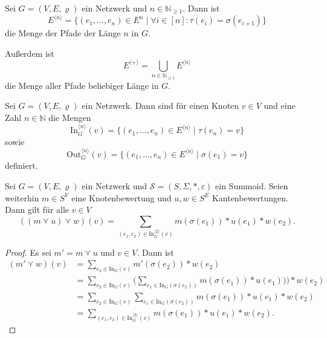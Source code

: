 \documentclass{article}
\begin{document}
\begin{definition}
  Sei $G = (V, E, \varrho)$ ein Netzwerk und $n \in \mathbb{N}_{\geq 1}$.
  Dann ist
  \begin{equation*}
    E^{\langle n \rangle} = \{(e_1, \dots, e_n) \in E^n \mid \forall i \in [n] \colon \tau(e_i) = \sigma(e_{i+1})\}
  \end{equation*}
  die Menge der Pfade der Länge $n$ in $G$.

  Außerdem ist
  \begin{equation*}
    E^{\langle + \rangle} = \bigcup_{n \in \mathbb{N}_{\geq 1}}E^{\langle n \rangle}
  \end{equation*}
  die Menge aller Pfade beliebiger Länge in $G$.
\end{definition}

\begin{definition}
  Sei $G = (V, E, \varrho)$ ein Netzwerk.
  Dann sind für einen Knoten $v \in V$ und eine Zahl $n \in \mathbb{N}$ die Mengen
  \begin{equation*}
    \text{In}^{\langle n \rangle}_G(v) = \{(e_1, \dots, e_n) \in E^{\langle n \rangle} \mid \tau(e_n) = v\}
  \end{equation*}
  sowie
  \begin{equation*}
    \text{Out}^{\langle n \rangle}_G(v) = \{(e_1, \dots, e_n) \in E^{\langle n \rangle} \mid \sigma(e_1) = v\}
  \end{equation*}
  definiert.
\end{definition}

\begin{theorem}\label{Theorem_PreMasterformel}
  Sei $G = (V, E, \varrho)$ ein Netzwerk und 
  $\mathcal{S} = (S, \Sigma, \ast, \varepsilon)$ ein Summoid.
  Seien weiterhin $m \in S^V$ eine Knotenbewertung und $u, w \in S^E$ Kantenbewertungen.
  Dann gilt für alle $v \in V$
  \begin{equation*}
    ((m \curlyvee u) \curlyvee w)(v) = \sum_{(e_1, e_2) \in \text{In}_G^{\langle 2 \rangle}(v)} m(\sigma(e_1)) \ast u(e_1) \ast w(e_2).
  \end{equation*}
\end{theorem}
\begin{proof}
  Es sei $m' = m \curlyvee u$ und $v \in V$. Dann ist
  \begin{align*}
    (m' \curlyvee w)(v)
    &= \sum_{e_2 \in \text{In}_G(v)} m' (\sigma(e_2)) \ast w(e_2) \\
    &= \sum_{e_2 \in \text{In}_G(v)} \bigg(\sum_{e_1 \in \text{In}_G(\sigma(e_2))}m(\sigma(e_1)) \ast u(e_1)) \bigg) \ast w(e_2) \\
    &= \sum_{e_2 \in \text{In}_G(v)} \sum_{e_1 \in \text{In}_G(\sigma(e_2))}m(\sigma(e_1)) \ast u(e_1) \ast w(e_2) \\
    &= \sum_{(e_1, e_2) \in \text{In}_G^{\langle 2 \rangle}(v)}m(\sigma(e_1)) \ast u(e_1) \ast w(e_2).
  \end{align*}
\end{proof}
\end{document}
